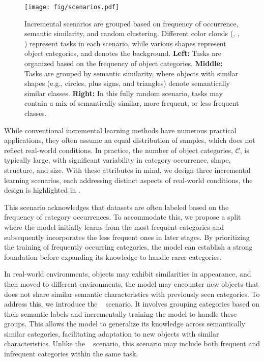 \begin{figure}[t]
  \centering
  \texttt{[image: fig/scenarios.pdf]}
  \caption{Incremental scenarios are grouped based on frequency of occurrence, semantic similarity, and random clustering. Different color clouds (, , ) represent tasks in each scenario, while various shapes represent object categories, and  denotes the background. \textbf{Left:} Tasks are organized based on the frequency of object categories. \textbf{Middle:} Tasks are grouped by semantic similarity, where objects with similar shapes (e.g., circles, plus signs, and triangles) denote semantically similar classes. \textbf{Right:} In this fully random scenario, tasks may contain a mix of semantically similar, more frequent, or less frequent classes.}
  \label{fig:scenarios}
\end{figure}

While conventional incremental learning methods have numerous practical applications, they often assume an equal distribution of samples, which does not reflect real-world conditions. In practice, the number of object categories, $\mathcal{C}$, is typically large, with significant variability in category occurrence, shape, structure, and size. With these attributes in mind, we design three incremental learning scenarios, each addressing distinct aspects of real-world conditions, the design is highlighted in .

This scenario acknowledges that datasets are often labeled based on the frequency of category occurrences. To accommodate this, we propose a split where the model initially learns from the most frequent categories and subsequently incorporates the less frequent ones in later stages. By prioritizing the training of frequently occurring categories, the model can establish a strong foundation before expanding its knowledge to handle rarer categories.

In real-world environments, objects may exhibit similarities in appearance, and then moved to different environments, the model may encounter new objects that does not share similar semantic characteristics with previously seen categories. To address this, we introduce the \ssplit~ scenario. It involves grouping categories based on their semantic labels and incrementally training the model to handle these groups. This allows the model to generalize its knowledge across semantically similar categories, facilitating adaptation to new objects with similar characteristics. Unlike the \fsplit~ scenario, this scenario may include both frequent and infrequent categories within the same task. 

